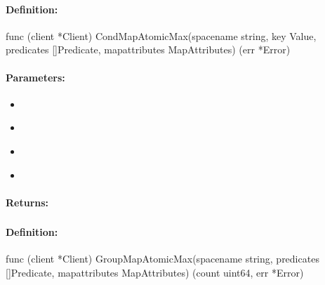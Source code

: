 \paragraph{Definition:}
\begin{gocode}
func (client *Client) CondMapAtomicMax(spacename string, key Value, predicates []Predicate, mapattributes MapAttributes) (err *Error)
\end{gocode}

\paragraph{Parameters:}
\begin{itemize}[noitemsep]
\item {}\\

\item {}\\

\item {}\\

\item {}\\

\end{itemize}

\paragraph{Returns:}


\pagebreak
\subsubsection{}
\label{api:Go:GroupMapAtomicMax}


\paragraph{Definition:}
\begin{gocode}
func (client *Client) GroupMapAtomicMax(spacename string, predicates []Predicate, mapattributes MapAttributes) (count uint64, err *Error)
\end{gocode}

